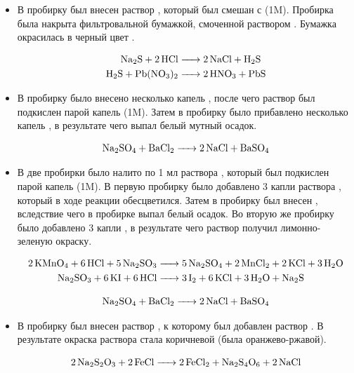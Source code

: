 \documentclass[a4paper, 12pt]{article}
\begin{document}
\begin{itemize}
\item 

В пробирку был внесен раствор , который был смешан с  (1M). Пробирка была накрыта фильтровальной бумажкой, смоченной раствором . Бумажка окрасилась в черный цвет .

\begin{align}
	\ce{Na2S + 2HCl &-> 2 NaCl + H2S}\\
	\ce{H2S + Pb(NO3)2 &-> 2 HNO3 + PbS}
\end{align}

\item

В пробирку было внесено несколько капель , после чего раствор был подкислен парой капель  (1M). Затем в пробирку было прибавлено несколько капель , в результате чего выпал белый мутный осадок.

\begin{equation}
	\ce{Na2SO4 + BaCl2 -> 2 NaCl + BaSO4}
\end{equation}

\item 

В две пробирки было налито по 1 мл раствора , который был подкислен парой капель  (1M). В первую пробирку было добавлено 3 капли раствора , который в ходе реакции обесцветился. Затем в пробирку был внесен , вследствие чего в пробирке выпал белый осадок. Во вторую же пробирку было добавлено 3 капли , в результате чего раствор получил лимонно-зеленую окраску. %

\begin{align}
	\ce{2 KMnO4 + 6 HCl + 5 Na2SO3 &-> 5 Na2SO4 + 2MnCl2 + 2KCl + 3H2O}\\
	\ce{Na2SO3 + 6 KI + 6 HCl &-> 3 I2 + 6 KCl + 3H2O + Na2S}
\end{align}

\begin{equation}
	\ce{Na2SO4 + BaCl2 -> 2 NaCl + BaSO4}
\end{equation}

\item 

В пробирку был внесен раствор , к которому был добавлен раствор . В результате окраска раствора стала коричневой (была оранжево-ржавой).

\begin{equation}
	\ce{2 Na2S2O3 + 2FeCl -> 2 FeCl2 + Na2S4O6 + 2 NaCl}
\end{equation}
\end{itemize}
\end{document}
